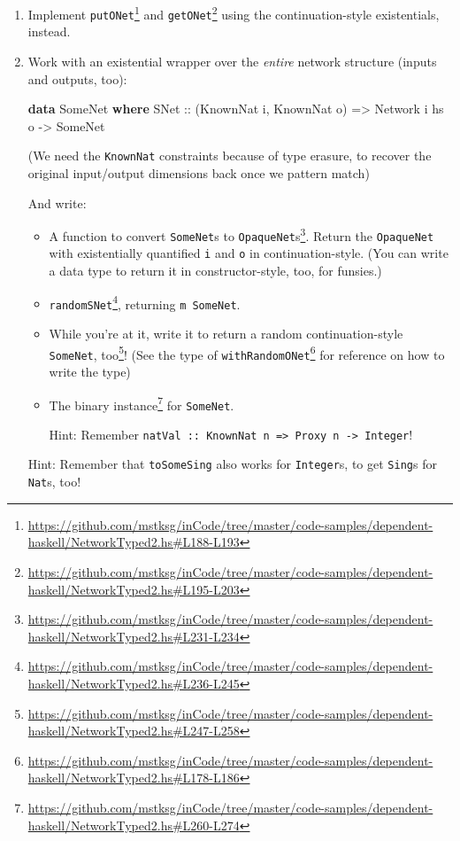 \documentclass[]{article}
\newenvironment{Shaded}{}{}
\newcommand{\DataTypeTok}[1]{\textcolor[rgb]{0.56,0.13,0.00}{#1}}
\newcommand{\KeywordTok}[1]{\textcolor[rgb]{0.00,0.44,0.13}{\textbf{#1}}}
\newcommand{\NormalTok}[1]{#1}
\newcommand{\OtherTok}[1]{\textcolor[rgb]{0.00,0.44,0.13}{#1}}
\renewcommand{\href}[2]{#2\footnote{\url{#1}}}
\begin{document}
\begin{enumerate}
\def\labelenumi{\arabic{enumi}.}
\item
  Implement
  \href{https://github.com/mstksg/inCode/tree/master/code-samples/dependent-haskell/NetworkTyped2.hs\#L188-L193}{\texttt{putONet\textquotesingle{}}}
  and
  \href{https://github.com/mstksg/inCode/tree/master/code-samples/dependent-haskell/NetworkTyped2.hs\#L195-L203}{\texttt{getONet\textquotesingle{}}}
  using the continuation-style existentials, instead.
\item
  Work with an existential wrapper over the \emph{entire} network structure
  (inputs and outputs, too):

\begin{Shaded}
\begin{Highlighting}[]
\KeywordTok{data} \DataTypeTok{SomeNet} \KeywordTok{where}
    \DataTypeTok{SNet}\OtherTok{ ::}\NormalTok{ (}\DataTypeTok{KnownNat}\NormalTok{ i, }\DataTypeTok{KnownNat}\NormalTok{ o)}
         \OtherTok{=>} \DataTypeTok{Network}\NormalTok{ i hs o}
         \OtherTok{->} \DataTypeTok{SomeNet}
\end{Highlighting}
\end{Shaded}

  (We need the \texttt{KnownNat} constraints because of type erasure, to recover
  the original input/output dimensions back once we pattern match)

  And write:

  \begin{itemize}
  \item
    A function to
    \href{https://github.com/mstksg/inCode/tree/master/code-samples/dependent-haskell/NetworkTyped2.hs\#L231-L234}{convert
    \texttt{SomeNet}s to \texttt{OpaqueNet}s}. Return the \texttt{OpaqueNet}
    with existentially quantified \texttt{i} and \texttt{o} in
    continuation-style. (You can write a data type to return it in
    constructor-style, too, for funsies.)
  \item
    \href{https://github.com/mstksg/inCode/tree/master/code-samples/dependent-haskell/NetworkTyped2.hs\#L236-L245}{\texttt{randomSNet}},
    returning \texttt{m\ SomeNet}.
  \item
    While you're at it, write it to return
    \href{https://github.com/mstksg/inCode/tree/master/code-samples/dependent-haskell/NetworkTyped2.hs\#L247-L258}{a
    random continuation-style \texttt{SomeNet}, too}! (See the type of
    \href{https://github.com/mstksg/inCode/tree/master/code-samples/dependent-haskell/NetworkTyped2.hs\#L178-L186}{\texttt{withRandomONet\textquotesingle{}}}
    for reference on how to write the type)
  \item
    The
    \href{https://github.com/mstksg/inCode/tree/master/code-samples/dependent-haskell/NetworkTyped2.hs\#L260-L274}{binary
    instance} for \texttt{SomeNet}.

    Hint: Remember
    \texttt{natVal\ ::\ KnownNat\ n\ =\textgreater{}\ Proxy\ n\ -\textgreater{}\ Integer}!
  \end{itemize}

  Hint: Remember that \texttt{toSomeSing} also works for \texttt{Integer}s, to
  get \texttt{Sing}s for \texttt{Nat}s, too!
\end{enumerate}
\end{document}
